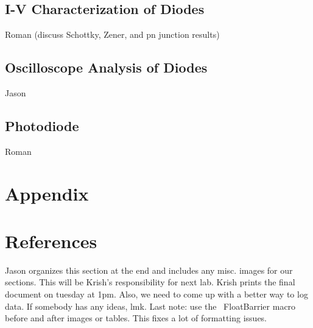 \documentclass{article}
\begin{document}
\begin{multicols}{2}
		\subsection{I-V Characterization of Diodes}
			Roman (discuss Schottky, Zener, and pn junction results)
		\subsection{Oscilloscope Analysis of Diodes}
			Jason
		\subsection{Photodiode}
			Roman
	\section{Appendix}
	\section{References}
	Jason organizes this section at the end and includes any misc. images for our sections. This will be Krish's responsibility for next lab.
	Krish prints the final document on tuesday at 1pm.
	Also, we need to come up with a better way to log data. If somebody has any ideas, lmk.
	Last note: use the \ FloatBarrier macro before and after images or tables. This fixes a lot of formatting issues.
	\end{multicols}
\end{document}
